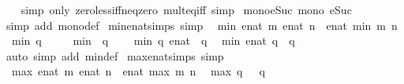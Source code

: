 \begin{isabellebody}
%
\isadelimproof
\ \ %
\endisadelimproof
%
\isatagproof
{}\isamarkupfalse%
\ {\isacharparenleft}simp\ only{\isacharcolon}\ zero{\isacharunderscore}less{\isacharunderscore}iff{\isacharunderscore}neq{\isacharunderscore}zero\ mult{\isacharunderscore}eq{\isacharunderscore}{}{\isacharunderscore}iff{\isacharcomma}\ simp{\isacharparenright}%
\endisatagproof
{\isafoldproof}%
%
\isadelimproof
\isanewline
%
\endisadelimproof
\isanewline
{}\isamarkupfalse%
\ mono{\isacharunderscore}eSuc{\isacharcolon}\ {\isachardoublequoteopen}mono\ eSuc{\isachardoublequoteclose}\isanewline
%
\isadelimproof
\ \ %
\endisadelimproof
%
\isatagproof
{}\isamarkupfalse%
\ {\isacharparenleft}simp\ add{\isacharcolon}\ mono{\isacharunderscore}def{\isacharparenright}%
\endisatagproof
{\isafoldproof}%
%
\isadelimproof
\isanewline
%
\endisadelimproof
\isanewline
{}\isamarkupfalse%
\ min{\isacharunderscore}enat{\isacharunderscore}simps\ {\isacharbrackleft}simp{\isacharbrackright}{\isacharcolon}\isanewline
\ \ {\isachardoublequoteopen}min\ {\isacharparenleft}enat\ m{\isacharparenright}\ {\isacharparenleft}enat\ n{\isacharparenright}\ {\isacharequal}\ enat\ {\isacharparenleft}min\ m\ n{\isacharparenright}{\isachardoublequoteclose}\isanewline
\ \ {\isachardoublequoteopen}min\ q\ {}\ {\isacharequal}\ {}{\isachardoublequoteclose}\isanewline
\ \ {\isachardoublequoteopen}min\ {}\ q\ {\isacharequal}\ {}{\isachardoublequoteclose}\isanewline
\ \ {\isachardoublequoteopen}min\ q\ {\isacharparenleft}{\isasyminfinity}{\isacharcolon}{\isacharcolon}enat{\isacharparenright}\ {\isacharequal}\ q{\isachardoublequoteclose}\isanewline
\ \ {\isachardoublequoteopen}min\ {\isacharparenleft}{\isasyminfinity}{\isacharcolon}{\isacharcolon}enat{\isacharparenright}\ q\ {\isacharequal}\ q{\isachardoublequoteclose}\isanewline
%
\isadelimproof
\ \ %
\endisadelimproof
%
\isatagproof
{}\isamarkupfalse%
\ {\isacharparenleft}auto\ simp\ add{\isacharcolon}\ min{\isacharunderscore}def{\isacharparenright}%
\endisatagproof
{\isafoldproof}%
%
\isadelimproof
\isanewline
%
\endisadelimproof
\isanewline
{}\isamarkupfalse%
\ max{\isacharunderscore}enat{\isacharunderscore}simps\ {\isacharbrackleft}simp{\isacharbrackright}{\isacharcolon}\isanewline
\ \ {\isachardoublequoteopen}max\ {\isacharparenleft}enat\ m{\isacharparenright}\ {\isacharparenleft}enat\ n{\isacharparenright}\ {\isacharequal}\ enat\ {\isacharparenleft}max\ m\ n{\isacharparenright}{\isachardoublequoteclose}\isanewline
\ \ {\isachardoublequoteopen}max\ q\ {}\ {\isacharequal}\ q{\isachardoublequoteclose}\isanewline

\end{isabellebody}
